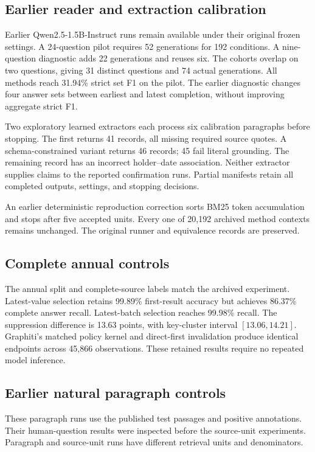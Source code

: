 \subsection{Earlier reader and extraction calibration}
Earlier Qwen2.5-1.5B-Instruct runs remain available under their original frozen settings.
A 24-question pilot requires 52 generations for 192 conditions.
A nine-question diagnostic adds 22 generations and reuses six.
The cohorts overlap on two questions, giving 31 distinct questions and 74 actual generations.
All methods reach 31.94\% strict set F1 on the pilot.
The earlier diagnostic changes four answer sets between earliest and latest completion, without improving aggregate strict F1.

Two exploratory learned extractors each process six calibration paragraphs before stopping.
The first returns 41 records, all missing required source quotes.
A schema-constrained variant returns 46 records; 45 fail literal grounding.
The remaining record has an incorrect holder--date association.
Neither extractor supplies claims to the reported confirmation runs.
Partial manifests retain all completed outputs, settings, and stopping decisions.

An earlier deterministic reproduction correction sorts BM25 token accumulation and stops after five accepted units.
Every one of 20,192 archived method contexts remains unchanged.
The original runner and equivalence records are preserved.

\subsection{Complete annual controls}


The annual split and complete-source labels match the archived experiment.
Latest-value selection retains 99.89\% first-result accuracy but achieves 86.37\% complete answer recall.
Latest-batch selection reaches 99.98\% recall.
The suppression difference is 13.63 points, with key-cluster interval $[13.06,14.21]$.
Graphiti's matched policy kernel and direct-first invalidation produce identical endpoints across 45,866 observations.
These retained results require no repeated model inference.

\subsection{Earlier natural paragraph controls}

These paragraph runs use the published test passages and positive annotations.
Their human-question results were inspected before the source-unit experiments.
Paragraph and source-unit runs have different retrieval units and denominators.
